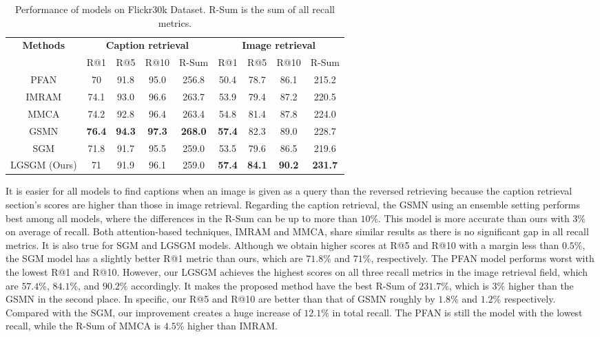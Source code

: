 \documentclass{IOS-Book-Article}
\begin{document}
\begin{table*}[ht!]
  \caption{Performance of models on Flickr30k Dataset. R-Sum is the sum of all recall metrics.}
  \label{tab:flickr30k}
  \begin{tabular}{|c|c|c|c|c|c|c|c|c|}
    \hline
    \multirow{2}{*}{\textbf{Methods}} & \multicolumn{4}{|c|}{\textbf{Caption retrieval}} & \multicolumn{4}{|c|}{\textbf{Image retrieval}}\\
    \cline{2-9}
    & R@1 & R@5 & R@10 & R-Sum & R@1 & R@5 & R@10 & R-Sum\\
    \hline
    PFAN \cite{wang2019position} & 70 & 91.8 & 95.0 & 256.8 & 50.4 & 78.7 & 86.1 & 215.2 \\
    \hline
    IMRAM \cite{chen2020imram} & 74.1 & 93.0 & 96.6 & 263.7 & 53.9 & 79.4 & 87.2 & 220.5 \\
    \hline
    MMCA \cite{wei2020multi} & 74.2 & 92.8 & 96.4 & 263.4 & 54.8 & 81.4 & 87.8 & 224.0 \\
    \hline
    GSMN \cite{liu2020graph} & \textbf{76.4} & \textbf{94.3} & \textbf{97.3} & \textbf{268.0} & \textbf{57.4} & 82.3 & 89.0 & 228.7\\
    \hline
    SGM \cite{wang2020cross} & 71.8 & 91.7 & 95.5 & 259.0 & 53.5 & 79.6 & 86.5 & 219.6\\
    \hline
    LGSGM (Ours) & 71 & 91.9 & 96.1 & 259.0 & \textbf{57.4} & \textbf{84.1} & \textbf{90.2} & \textbf{231.7}\\
    \hline
\end{tabular}
\end{table*}

It is easier for all models to find captions when an image is given as a query than the reversed retrieving because the caption retrieval section's scores are higher than those in image retrieval. Regarding the caption retrieval, the GSMN using an ensemble setting performs best among all models, where the differences in the R-Sum can be up to more than $10\%$. This model is more accurate than ours with $3\%$ on average of recall. Both attention-based techniques, IMRAM and MMCA, share similar results as there is no significant gap in all recall metrics. It is also true for SGM and LGSGM models. Although we obtain higher scores at R@5 and R@10 with a margin less than $0.5\%$, the SGM model has a slightly better R@1 metric than ours, which are $71.8\%$ and $71\%$, respectively. The PFAN model performs worst with the lowest R@1 and R@10. However, our LGSGM achieves the highest scores on all three recall metrics in the image retrieval field, which are $57.4\%$, $84.1\%$, and $90.2\%$ accordingly. It makes the proposed method have the best R-Sum of $231.7\%$, which is $3\%$ higher than the GSMN in the second place. In specific, our R@5 and R@10 are better than that of GSMN roughly by $1.8\%$ and $1.2\%$ respectively. Compared with the SGM, our improvement creates a huge increase of $12.1\%$ in total recall. The PFAN is still the model with the lowest recall, while the R-Sum of MMCA is $4.5\%$ higher than IMRAM.
\end{document}
